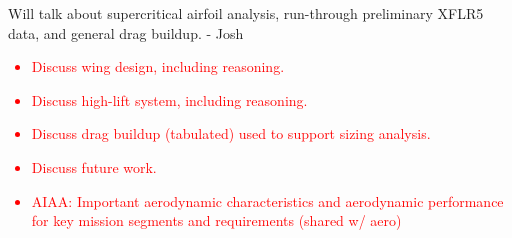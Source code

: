Will talk about supercritical airfoil analysis, run-through preliminary XFLR5 data, and general drag buildup. - Josh
\textcolor{red}{
\begin{itemize}
    \item Discuss wing design, including reasoning.
    \item Discuss high-lift system, including reasoning.
    \item Discuss drag buildup (tabulated) used to support sizing analysis.
    \item Discuss future work.
    \item AIAA: Important aerodynamic characteristics and aerodynamic performance for key mission
    segments and requirements (shared w/ aero)
\end{itemize}}